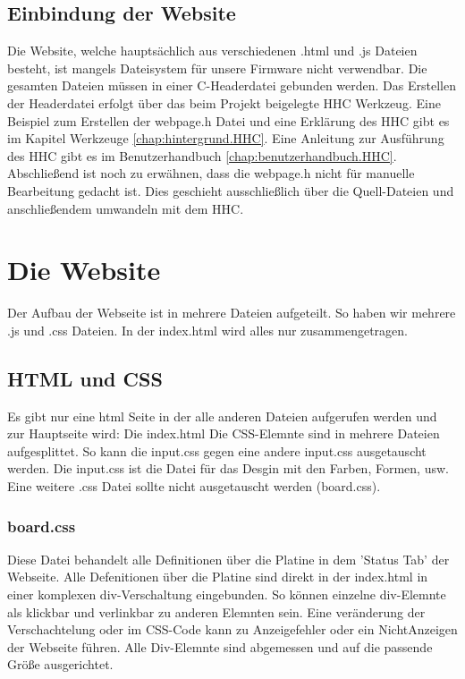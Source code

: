 \subsection{Einbindung der Website}

Die Website, welche hauptsächlich aus verschiedenen .html und .js Dateien
besteht, ist mangels Dateisystem für unsere Firmware nicht verwendbar. Die
gesamten Dateien müssen in einer C-Headerdatei gebunden werden.
Das Erstellen der Headerdatei erfolgt über das beim Projekt beigelegte
\ac{HHC} Werkzeug. Eine Beispiel zum Erstellen der \textrm{webpage.h} 
Datei und eine Erklärung des \ac{HHC} gibt es im Kapitel Werkzeuge
\ref{chap:hintergrund.HHC}. Eine Anleitung zur Ausführung des \ac{HHC} gibt es im
Benutzerhandbuch \ref{chap:benutzerhandbuch.HHC}.
Abschließend ist noch zu erwähnen, dass die \textrm{webpage.h} nicht für manuelle
Bearbeitung gedacht ist. Dies geschieht ausschließlich über die Quell-Dateien
und anschließendem umwandeln mit dem \ac{HHC}.

\section{Die Website}

Der Aufbau der Webseite ist in mehrere Dateien aufgeteilt. So haben wir mehrere
.js und .css Dateien. In der index.html wird alles nur zusammengetragen.

\subsection{HTML und CSS}
Es gibt nur eine html Seite in der alle anderen Dateien aufgerufen werden und zur
Hauptseite wird: Die index.html\newline
Die CSS-Elemnte sind in mehrere Dateien aufgesplittet. So kann die input.css
gegen eine andere input.css ausgetauscht werden. Die input.css ist die Datei für
das Desgin mit den Farben, Formen, usw.\newline
Eine weitere .css Datei sollte nicht ausgetauscht werden (board.css).

\subsubsection{board.css}
Diese Datei behandelt alle Definitionen über die Platine in dem 'Status
Tab' der Webseite. Alle Defenitionen über die Platine sind direkt in der
index.html in einer komplexen div-Verschaltung eingebunden. So können einzelne
div-Elemnte als klickbar und verlinkbar zu anderen Elemnten sein. Eine
veränderung der Verschachtelung oder im CSS-Code kann zu Anzeigefehler oder ein
NichtAnzeigen der Webseite führen.\newline
Alle Div-Elemnte sind abgemessen und auf die passende Größe ausgerichtet. 


